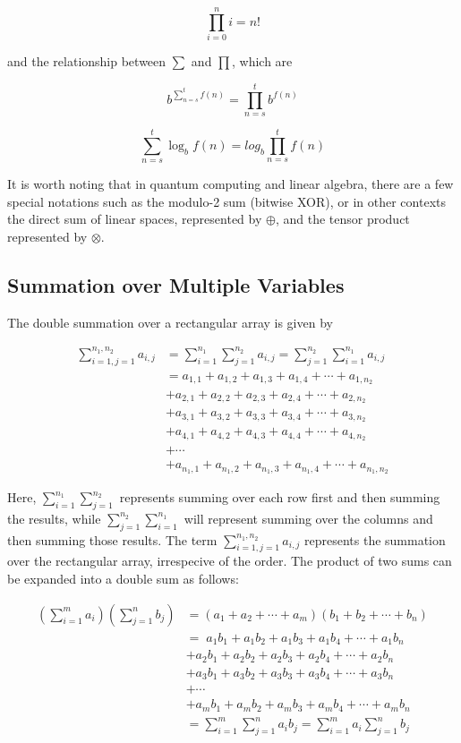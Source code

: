 \documentclass[12pt]{article}
\theoremstyle{definition}
\begin{document}
$$\prod_{i=0}^{n} i = n!$$

and the relationship between $\sum$ and $\prod$, which are 

$$b^{\sum_{n=s}^{t} f(n)} = \prod_{n=s}^{t} b^{f(n)}$$

$$\sum_{n=s}^{t} \log_b f(n) = log_b \prod_{n=s}^{t} f(n)$$

It is worth noting that in quantum computing and linear algebra, there are a few special notations such as the modulo-2 sum (bitwise XOR), or in other contexts the direct sum of linear spaces, represented by $\oplus$, and the tensor product represented by $\otimes$.

\subsection{Summation over Multiple Variables}

The double summation over a rectangular array is given by 

\begin{align*}
    \sum_{i=1,j=1}^{n_1, n_2} a_{i,j} &= \sum_{i=1}^{n_1} \sum_{j=1}^{n_2} a_{i, j} = \sum_{j=1}^{n_2} \sum_{i=1}^{n_1} a_{i, j} \\
    &= a_{1, 1} + a_{1, 2} + a_{1, 3} + a_{1, 4} + \cdots + a_{1, n_2} \\
    &+ a_{2, 1} + a_{2, 2} + a_{2, 3} + a_{2, 4} + \cdots + a_{2, n_2} \\
    & + a_{3, 1} + a_{3, 2} + a_{3, 3} + a_{3, 4} + \cdots + a_{3, n_2} \\
    & + a_{4, 1} + a_{4, 2} + a_{4, 3} + a_{4, 4} + \cdots + a_{4, n_2} \\
    & + \cdots \\
    & + a_{n_1, 1} + a_{n_1, 2} + a_{n_1, 3} + a_{n_1, 4} + \cdots + a_{n_1, n_2}
\end{align*}

Here, $\sum_{i=1}^{n_1} \sum_{j=1}^{n_2}$ represents summing over each row first and then summing the results, while $\sum_{j=1}^{n_2} \sum_{i=1}^{n_1}$ will represent summing over the columns and then summing those results. The term $\sum_{i=1,j=1}^{n_1, n_2} a_{i,j}$ represents the summation over the rectangular array, irrespecive of the order. The product of two sums can be expanded into a double sum as follows:

\begin{align*}
\left( \sum_{i=1}^{m} a_i \right) \left( \sum_{j=1}^{n} b_j \right)
    &= (a_1 + a_2 + \cdots + a_m)(b_1 + b_2 + \cdots + b_n) \\
    &=\; a_1b_1 + a_1b_2 + a_1b_3 + a_1b_4 + \cdots + a_1b_n \\
    &+ a_2b_1 + a_2b_2 + a_2b_3 + a_2b_4 + \cdots + a_2b_n \\
    &+ a_3b_1 + a_3b_2 + a_3b_3 + a_3b_4 + \cdots + a_3b_n \\
    &+ \cdots \\
    &+ a_mb_1 + a_mb_2 + a_mb_3 + a_mb_4 + \cdots + a_mb_n \\
    &= \sum_{i=1}^{m} \sum_{j=1}^{n} a_i b_j = \sum_{i=1}^{m} a_i \sum_{j=1}^{n} b_j
\end{align*}
\end{document}
